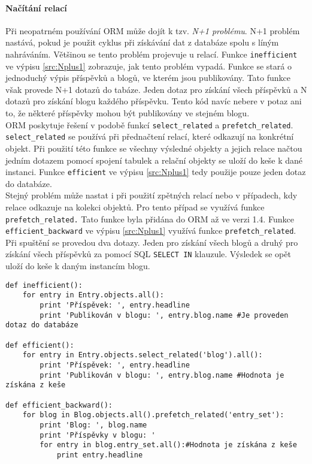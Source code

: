 \documentclass[ing,male,java,dept456]{diploma}						%
\begin{document}
\paragraph{Načítání relací} 
\label{par:N+1}
Při neopatrném používání ORM může dojít k tzv. \textit{N+1 problému}. N+1 problém nastává, pokud je použit cyklus při získávání dat z databáze spolu s líným nahráváním. Většinou se tento problém projevuje u relací. Funkce \lstinline[style=custompython]|inefficient| ve výpisu \ref{src:Nplus1} zobrazuje, jak tento problém vypadá. Funkce se stará o jednoduchý výpis příspěvků a blogů, ve kterém jsou publikovány. Tato funkce však provede N+1 dotazů do tabáze. Jeden dotaz pro získání všech příspěvků a N dotazů pro získání blogu každého příspěvku. Tento kód navíc nebere v potaz ani to, že některé příspěvky mohou být publikovány ve stejném blogu. \\
ORM poskytuje řešení v podobě funkcí \lstinline[style=custompython]|select_related| a \lstinline[style=custompython]|prefetch_related|. \\ 
\lstinline[style=custompython]|select_related| se používá při přednačtení relací, které odkazují na konkrétní objekt. Při použití této funkce se všechny výsledné objekty a jejich relace načtou jedním dotazem pomocí spojení tabulek a relační objekty se uloží do keše k dané instanci. Funkce \lstinline[style=custompython]|efficient| ve výpisu \ref{src:Nplus1} tedy použije pouze jeden dotaz do databáze. \\
Stejný problém může nastat i při použití zpětných relací nebo v případech, kdy relace odkazuje na kolekci objektů. Pro tento případ se využívá funkce \lstinline[style=custompython]|prefetch_related.| Tato funkce byla přidána do ORM až ve verzi 1.4. Funkce \lstinline[style=custompython]|efficient_backward| ve výpisu \ref{src:Nplus1} využívá funkce \lstinline[style=custompython]|prefetch_related|. Při spuštění se provedou dva dotazy. Jeden pro získání všech blogů a druhý pro získání všech příspěvků za pomocí SQL \lstinline[style=customsql]|SELECT IN| klauzule. Výsledek se opět uloží do keše k daným instancím blogu. 

\begin{lstlisting}[style=custompython, label=src:Nplus1, caption={N+1 problém a jeho řešení}]
def inefficient():
	for entry in Entry.objects.all():
		print 'Příspěvek: ', entry.headline
		print 'Publikován v blogu: ', entry.blog.name #Je proveden dotaz do databáze
		
def efficient():
	for entry in Entry.objects.select_related('blog').all():
		print 'Příspěvek: ', entry.headline
		print 'Publikován v blogu: ', entry.blog.name #Hodnota je získána z keše
		
def efficient_backward():
	for blog in Blog.objects.all().prefetch_related('entry_set'):
		print 'Blog: ', blog.name
		print 'Příspěvky v blogu: '
		for entry in blog.entry_set.all():#Hodnota je získána z keše
			print entry.headline
\end{lstlisting}
\end{document}
